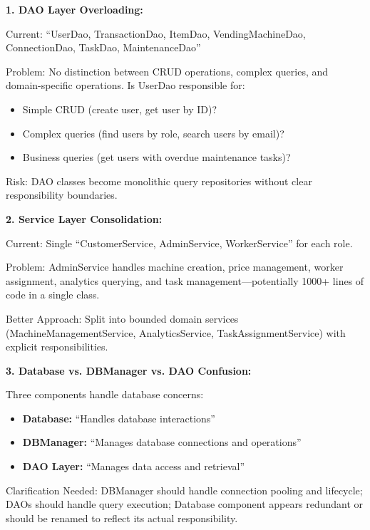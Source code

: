 \documentclass[11pt,a4paper]{article}
\begin{document}
\begin{tcolorbox}[colback=criticalred!5,colframe=criticalred,title=\textbf{Responsibility Ambiguity Issues}]
\textbf{1. DAO Layer Overloading:}

Current: ``UserDao, TransactionDao, ItemDao, VendingMachineDao, ConnectionDao, TaskDao, MaintenanceDao''

Problem: No distinction between CRUD operations, complex queries, and domain-specific operations. Is UserDao responsible for:
\begin{itemize}
    \item Simple CRUD (create user, get user by ID)?
    \item Complex queries (find users by role, search users by email)?
    \item Business queries (get users with overdue maintenance tasks)?
\end{itemize}

Risk: DAO classes become monolithic query repositories without clear responsibility boundaries.

\textbf{2. Service Layer Consolidation:}

Current: Single ``CustomerService, AdminService, WorkerService'' for each role.

Problem: AdminService handles machine creation, price management, worker assignment, analytics querying, and task management—potentially 1000+ lines of code in a single class.

Better Approach: Split into bounded domain services (MachineManagementService, AnalyticsService, TaskAssignmentService) with explicit responsibilities.

\textbf{3. Database vs. DBManager vs. DAO Confusion:}

Three components handle database concerns:
\begin{itemize}
    \item \textbf{Database:} ``Handles database interactions''
    \item \textbf{DBManager:} ``Manages database connections and operations''
    \item \textbf{DAO Layer:} ``Manages data access and retrieval''
\end{itemize}

Clarification Needed: DBManager should handle connection pooling and lifecycle; DAOs should handle query execution; Database component appears redundant or should be renamed to reflect its actual responsibility.
\end{tcolorbox}
\end{document}

